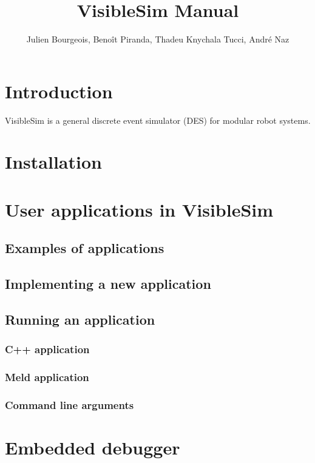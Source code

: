 \documentclass[11pt]{article}
\title{VisibleSim Manual}
\author{Julien Bourgeois, Benoît Piranda, Thadeu Knychala Tucci, André Naz}
\begin{document}
\maketitle

\newpage
\tableofcontents
\newpage

\section{Introduction}

VisibleSim is a general discrete event simulator (DES) for modular robot systems.

\section{Installation}

\section{User applications in VisibleSim}

\subsection{Examples of applications}

\subsection{Implementing a new application}

\subsection{Running an application}
\subsubsection{C++ application}
\subsubsection{Meld application}
\subsubsection{Command line arguments}

\section{Embedded debugger}
\end{document}
